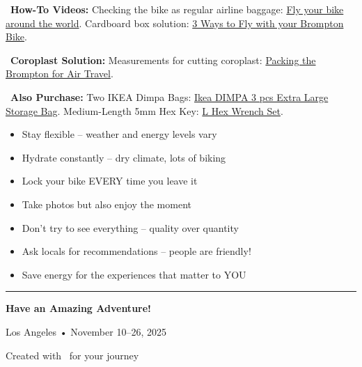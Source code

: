 \documentclass[10pt,letterpaper]{article}
\begin{document}
\begin{tipbox}[title=\faLuggageCart\ Packing Brompton for Airline Baggage:]
\begin{small}
\faYoutube\ \textbf{How-To Videos:} Checking the bike as regular airline baggage: \href{https://youtube.com/shorts/hHF_0A1559g}{Fly your bike around the world}. Cardboard box solution: \href{https://youtu.be/ihlxnkhQE5Q?t=147}{3 Ways to Fly with your Brompton Bike}.

\faBloggerB\ \textbf{Coroplast Solution:} Measurements for cutting coroplast: \href{https://ahpekbiker.blogspot.com/2015/03/brompton-accessories-15-packing.html}{Packing the Brompton for Air Travel}.

\faShoppingBag\ \textbf{Also Purchase:} Two IKEA Dimpa Bags: \href{https://www.amazon.com/IKEA-DIMPA-Storage-Moisture-Protection/dp/B07F98BQ6W/ref=sr_1_1}{Ikea DIMPA 3 pcs Extra Large Storage Bag}. Medium-Length 5mm Hex Key: \href{https://www.rei.com/product/705922/pedros-l-hex-wrench-set}{L Hex Wrench Set}.
\end{small}
\end{tipbox}

\begin{tipbox}[title=\faStar\ Final Tips for Success:]
\begin{small}
\begin{itemize}[leftmargin=0.2in,itemsep=1pt]
\item Stay flexible -- weather and energy levels vary
\item Hydrate constantly -- dry climate, lots of biking
\item Lock your bike EVERY time you leave it
\item Take photos but also enjoy the moment
\item Don't try to see everything -- quality over quantity
\item Ask locals for recommendations -- people are friendly!
\item Save energy for the experiences that matter to YOU
\end{itemize}
\end{small}
\end{tipbox}

\vspace{0.5in}

\begin{center}
\rule{0.8\textwidth}{2pt}

\vspace{0.2in}

{\Large\bfseries\color{primary} Have an Amazing Adventure! \faPlaneDeparture\ \faSun\ \faBicycle}

\vspace{0.15in}

{\large Los Angeles • November 10--26, 2025}

\vspace{0.1in}

{\small\color{gray} Created with \faHeart\ for your journey}
\end{center}
\end{document}
